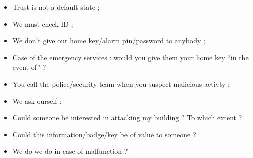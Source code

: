 \documentclass[11pt]{article} %
\begin{document}
\begin{itemize}
\item Trust is not a default state ;
\item We must check ID ;
\item We don't give our home key/alarm pin/password to anybody ;
\item Case of the emergency services : would you give them your home key ``in the event of'' ?
\item You call the police/security team when you suspect malicious activty ;
\item We ask ourself : 
\item Could someone be interested in attacking my building ? To which extent ?
\item Could this information/badge/key be of value to someone ?
\item We do we do in case of malfunction ?
\end{itemize}

%
\end{document}
